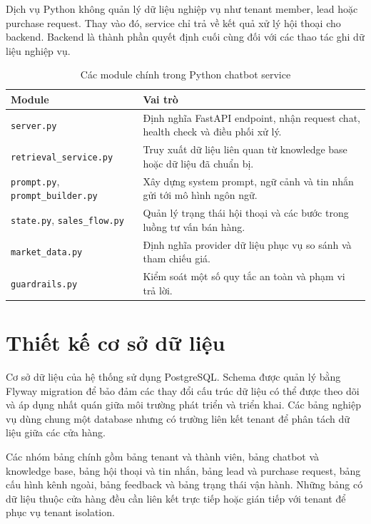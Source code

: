 \documentclass[../DoAn.tex]{subfiles}
\begin{document}
Dịch vụ Python không quản lý dữ liệu nghiệp vụ như tenant member, lead hoặc purchase request. Thay vào đó, service chỉ trả về kết quả xử lý hội thoại cho backend. Backend là thành phần quyết định cuối cùng đối với các thao tác ghi dữ liệu nghiệp vụ.

\begin{table}[H]
\centering
\caption{Các module chính trong Python chatbot service}
\label{tab:ch4-python-modules}
\begin{tabular}{|p{}|p{}|}
\hline
\textbf{Module} & \textbf{Vai trò} \\
\hline
\texttt{server.py} & Định nghĩa FastAPI endpoint, nhận request chat, health check và điều phối xử lý. \\
\hline
\texttt{retrieval\_service.py} & Truy xuất dữ liệu liên quan từ knowledge base hoặc dữ liệu đã chuẩn bị. \\
\hline
\texttt{prompt.py}, \texttt{prompt\_builder.py} & Xây dựng system prompt, ngữ cảnh và tin nhắn gửi tới mô hình ngôn ngữ. \\
\hline
\texttt{state.py}, \texttt{sales\_flow.py} & Quản lý trạng thái hội thoại và các bước trong luồng tư vấn bán hàng. \\
\hline
\texttt{market\_data.py} & Định nghĩa provider dữ liệu phục vụ so sánh và tham chiếu giá. \\
\hline
\texttt{guardrails.py} & Kiểm soát một số quy tắc an toàn và phạm vi trả lời. \\
\hline
\end{tabular}
\end{table}


\section{Thiết kế cơ sở dữ liệu}

Cơ sở dữ liệu của hệ thống sử dụng PostgreSQL. Schema được quản lý bằng Flyway migration để bảo đảm các thay đổi cấu trúc dữ liệu có thể được theo dõi và áp dụng nhất quán giữa môi trường phát triển và triển khai. Các bảng nghiệp vụ dùng chung một database nhưng có trường liên kết tenant để phân tách dữ liệu giữa các cửa hàng.

Các nhóm bảng chính gồm bảng tenant và thành viên, bảng chatbot và knowledge base, bảng hội thoại và tin nhắn, bảng lead và purchase request, bảng cấu hình kênh ngoài, bảng feedback và bảng trạng thái vận hành. Những bảng có dữ liệu thuộc cửa hàng đều cần liên kết trực tiếp hoặc gián tiếp với tenant để phục vụ tenant isolation.
\end{document}
